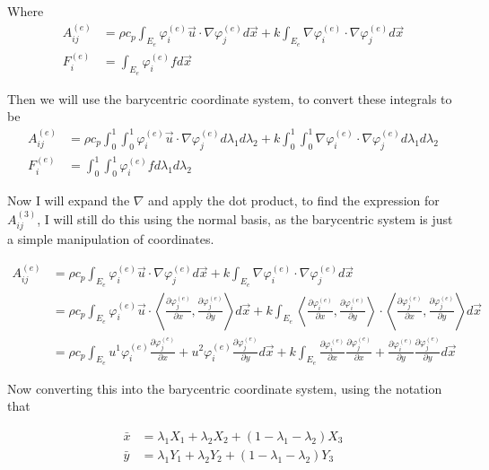 \documentclass[9pt]{amsart}
\newcommand{\e}[2]{_{#1}^{(#2)}}
\newcommand{\pder}[2]{\frac{\partial #1}{\partial #2}}
\begin{document}
Where
\begin{align*}
  A\e{ij}{e}&=\rho
  c_p\int_{E_e}\varphi\e{i}{e}\vec{u}\cdot\nabla\varphi\e{j}{e}d\vec{x}+
  k\int_{E_e}\nabla\varphi\e{i}{e}\cdot\nabla\varphi\e{j}{e}d\vec{x}\\
  F\e{i}{e}&=\int_{E_e}\varphi\e{i}{e}fd\vec{x}
\end{align*}

Then we will use the barycentric coordinate system, to convert these integrals
to be
\begin{align*}
  A\e{ij}{e}&=\rho
  c_p\int_0^1\int_0^1\varphi\e{i}{e}\vec{u}\cdot\nabla\varphi\e{j}{e}d\lambda_1d\lambda_2+
  k\int_0^1\int_0^1\nabla\varphi\e{i}{e}\cdot\nabla\varphi\e{j}{e}d\lambda_1d\lambda_2\\
  F\e{i}{e}&=\int_0^1\int_0^1\varphi\e{i}{e}fd\lambda_1d\lambda_2
\end{align*}

Now I will expand the $\nabla$ and apply the dot product, to find the
expression for $A\e{ij}{3}$, I will still do this using the normal basis, as
the barycentric system is just a simple manipulation of coordinates.

\begin{align*}
  A\e{ij}{e}&=\rho
  c_p\int_{E_e}\varphi\e{i}{e}\vec{u}\cdot\nabla\varphi\e{j}{e}d\vec{x}+
  k\int_{E_e}\nabla\varphi\e{i}{e}\cdot\nabla\varphi\e{j}{e}d\vec{x}\\
            &=\rho
            c_p\int_{E_e}\varphi\e{i}{e}\vec{u}\cdot\left<\pder{\varphi\e{j}{e}}{x},\pder{\varphi\e{j}{e}}{y}\right>d\vec{x} +
            k\int_{E_e}\left<\pder{\varphi\e{i}{e}}{x},\pder{\varphi\e{i}{e}}{y}\right>\cdot\left<\pder{\varphi\e{j}{e}}{x},\pder{\varphi\e{j}{e}}{y}\right>d\vec{x} \\
            &=\rho c_p
            \int_{E_e}u^1\varphi\e{i}{e}\pder{\varphi\e{j}{e}}{x}+u^2\varphi\e{i}{e}\pder{\varphi\e{j}{e}}{y}d\vec{x}+
            k\int_{E_e}\pder{\varphi\e{i}{e}}{x}\pder{\varphi\e{j}{e}}{x}+
            \pder{\varphi\e{i}{e}}{y}\pder{\varphi\e{j}{e}}{y}d\vec{x}
\end{align*}

Now converting this into the barycentric coordinate system, using the notation
that

\begin{align*}
  \bar{x}&=\lambda_1X_1+\lambda_2X_2+(1-\lambda_1-\lambda_2)X_3\\
  \bar{y}&=\lambda_1Y_1+\lambda_2Y_2+(1-\lambda_1-\lambda_2)Y_3\\
\end{align*}
\end{document}
